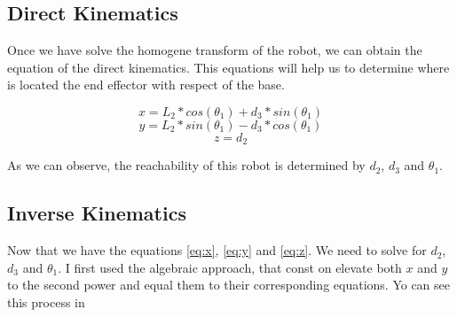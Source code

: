 \documentclass[12pt]{article}
\begin{document}
        \subsection{Direct Kinematics}
        
        Once we have solve the homogene transform of the robot, we can obtain the equation of the direct kinematics.
        This equations will help us to determine where is located the end effector with respect of the base.
        
    \begin{equation}
	    x = L_2 * cos(\theta_1) + d_3 * sin(\theta_1)
        \label{eq:x}
    \end{equation}
    \begin{equation}
        y = L_2 * sin(\theta_1) - d_3 * cos(\theta_1) 
        \label{eq:y}
    \end{equation}
    \begin{equation}
        z = d_2
        \label{eq:z}
    \end{equation} 

        As  we can observe, the reachability of this robot is determined by $d_2$, $d_3$ and $\theta_1$.
        \subsection{Inverse Kinematics}
        Now that we have the equations \ref*{eq:x}, \ref*{eq:y} and \ref*{eq:z}. We need to solve for $d_2$, $d_3$ and $\theta_1$.
        I first used the algebraic approach, that const on elevate both $x$ and $y$ to the second power and equal them to their corresponding equations.
        Yo can see this process in
        
\end{document}
